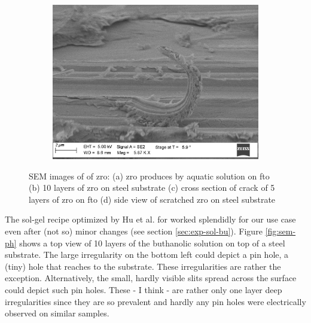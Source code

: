 \begin{figure}[bht]
\begin{subfigure}{.45\textwidth}
		\caption{}%
		\label{fig:sem-cs1}
    \end{subfigure}
    \begin{subfigure}{.45\textwidth}
        \centering
        \includegraphics[width=.8\textwidth]{Pics/sem/150_steel_cs_2Fx5.png}
		\caption{}%
		\label{fig:sem-cs2}
    \end{subfigure}
	\caption{
		SEM images of of \gls{zro}:
		(a) \gls{zro} produces by aquatic solution on \gls{fto}
		(b) 10 layers of \gls{zro} on steel substrate
		(c) cross section of crack of 5 layers of \gls{zro} on fto 
		(d) side view of scratched \gls{zro} on steel substrate
		\label{fig:sem}
	}
\end{figure}


The sol-gel recipe optimized by Hu et al.\cite{Hu2016} for  worked splendidly for our use case even after (not so) minor changes (see section \ref{sec:exp-sol-bu}). 
%
Figure \ref{fig:sem-ph} shows a top view of 10 layers of the buthanolic solution on top of a steel substrate. 
The large irregularity on the bottom left could depict a pin hole, a (tiny) hole that reaches to the substrate. 
These irregularities are rather the exception. 
Alternatively, the small, hardly visible slits spread across the surface could depict such pin holes. 
These - I think - are rather only one layer deep irregularities since they are so prevalent
and hardly any pin holes were electrically observed on similar samples. 

